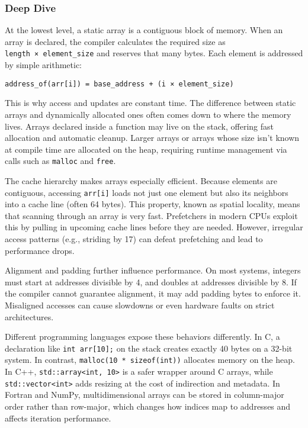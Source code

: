 \documentclass[
  letterpaper,
  DIV=11,
  numbers=noendperiod]{scrreprt}
\begin{document}
\subsubsection{Deep Dive}\label{deep-dive-5}

At the lowest level, a static array is a contiguous block of memory.
When an array is declared, the compiler calculates the required size as
\texttt{length\ ×\ element\_size} and reserves that many bytes. Each
element is addressed by simple arithmetic:

\begin{verbatim}
address_of(arr[i]) = base_address + (i × element_size)
\end{verbatim}

This is why access and updates are constant time. The difference between
static arrays and dynamically allocated ones often comes down to where
the memory lives. Arrays declared inside a function may live on the
stack, offering fast allocation and automatic cleanup. Larger arrays or
arrays whose size isn't known at compile time are allocated on the heap,
requiring runtime management via calls such as \texttt{malloc} and
\texttt{free}.

The cache hierarchy makes arrays especially efficient. Because elements
are contiguous, accessing \texttt{arr{[}i{]}} loads not just one element
but also its neighbors into a cache line (often 64 bytes). This
property, known as spatial locality, means that scanning through an
array is very fast. Prefetchers in modern CPUs exploit this by pulling
in upcoming cache lines before they are needed. However, irregular
access patterns (e.g., striding by 17) can defeat prefetching and lead
to performance drops.

Alignment and padding further influence performance. On most systems,
integers must start at addresses divisible by 4, and doubles at
addresses divisible by 8. If the compiler cannot guarantee alignment, it
may add padding bytes to enforce it. Misaligned accesses can cause
slowdowns or even hardware faults on strict architectures.

Different programming languages expose these behaviors differently. In
C, a declaration like \texttt{int\ arr{[}10{]};} on the stack creates
exactly 40 bytes on a 32-bit system. In contrast,
\texttt{malloc(10\ *\ sizeof(int))} allocates memory on the heap. In
C++, \texttt{std::array\textless{}int,\ 10\textgreater{}} is a safer
wrapper around C arrays, while
\texttt{std::vector\textless{}int\textgreater{}} adds resizing at the
cost of indirection and metadata. In Fortran and NumPy, multidimensional
arrays can be stored in column-major order rather than row-major, which
changes how indices map to addresses and affects iteration performance.
\end{document}
